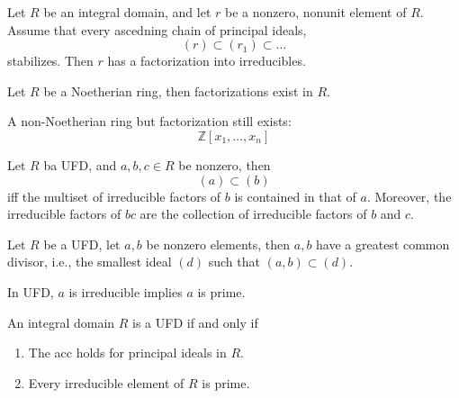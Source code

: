 \documentclass[openany]{book}
\newcommand{\Z}{\mathbb{Z}}
\begin{document}



\begin{prop}
    Let $R$ be an integral domain, and let $r$ be a nonzero, nonunit element of $R$. Assume that every ascedning chain of principal ideals, 
    \begin{equation*}
        (r)\subset (r_1)\subset\dots
    \end{equation*}
    stabilizes. Then $r$ has a factorization into irreducibles.
\end{prop}

\begin{cor}
    Let $R$ be a Noetherian ring, then factorizations exist in $R$.

    A non-Noetherian ring but factorization still exists:
    \begin{equation*}
        \Z[x_1,\dots,x_n]
    \end{equation*}
\end{cor}




\begin{prop}
    Let $R$ ba UFD, and $a,b,c\in R$ be nonzero, then 
    \begin{equation*}
        (a)\subset(b)
    \end{equation*}
    iff the multiset of irreducible factors of $b$ is contained in that of $a$. Moreover, the irreducible factors of $bc$ are the collection of irreducible factors of $b$ and $c$.
\end{prop}



\begin{prop}
    Let $R$ be a UFD, let $a,b$ be nonzero elements, then $a,b$ have a greatest common divisor, i.e., the smallest ideal $(d)$ such that $(a,b)\subset (d)$.
\end{prop}

\begin{prop}
    In UFD, $a$ is irreducible implies $a$ is prime.
\end{prop}

\begin{thm}
    An integral domain $R$ is a UFD if and only if 
    \begin{enumerate}
        \item The acc holds for principal ideals in $R$.
        \item Every irreducible element of $R$ is prime.
    \end{enumerate}
\end{thm}
\end{document}
